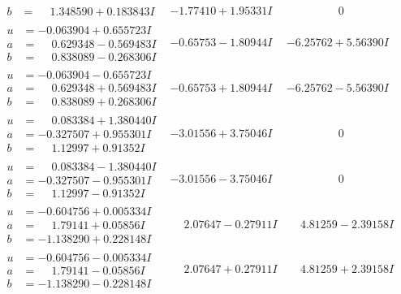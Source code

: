 \documentclass[1p]{elsarticle_modified}
\theoremstyle{definition}
\begin{document}
$$\begin{array}{c|c|c}
\begin{aligned}
b &= \phantom{-}1.348590 + 0.183843 I\end{aligned}
 & -1.77410 + 1.95331 I & \phantom{-0.000000 } 0 \\ \hline\begin{aligned}
u &= -0.063904 + 0.655723 I \\
a &= \phantom{-}0.629348 - 0.569483 I \\
b &= \phantom{-}0.838089 - 0.268306 I\end{aligned}
 & -0.65753 - 1.80944 I & -6.25762 + 5.56390 I \\ \hline\begin{aligned}
u &= -0.063904 - 0.655723 I \\
a &= \phantom{-}0.629348 + 0.569483 I \\
b &= \phantom{-}0.838089 + 0.268306 I\end{aligned}
 & -0.65753 + 1.80944 I & -6.25762 - 5.56390 I \\ \hline\begin{aligned}
u &= \phantom{-}0.083384 + 1.380440 I \\
a &= -0.327507 + 0.955301 I \\
b &= \phantom{-}1.12997 + 0.91352 I\end{aligned}
 & -3.01556 + 3.75046 I & \phantom{-0.000000 } 0 \\ \hline\begin{aligned}
u &= \phantom{-}0.083384 - 1.380440 I \\
a &= -0.327507 - 0.955301 I \\
b &= \phantom{-}1.12997 - 0.91352 I\end{aligned}
 & -3.01556 - 3.75046 I & \phantom{-0.000000 } 0 \\ \hline\begin{aligned}
u &= -0.604756 + 0.005334 I \\
a &= \phantom{-}1.79141 + 0.05856 I \\
b &= -1.138290 + 0.228148 I\end{aligned}
 & \phantom{-}2.07647 - 0.27911 I & \phantom{-}4.81259 - 2.39158 I \\ \hline\begin{aligned}
u &= -0.604756 - 0.005334 I \\
a &= \phantom{-}1.79141 - 0.05856 I \\
b &= -1.138290 - 0.228148 I\end{aligned}
 & \phantom{-}2.07647 + 0.27911 I & \phantom{-}4.81259 + 2.39158 I \\ \hline\begin{aligned}

\end{aligned}
\end{array}$$
\end{document}
